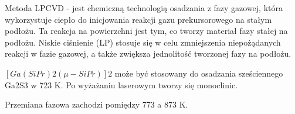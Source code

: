 Metoda LPCVD - jest chemiczną technologią osadzania z fazy gazowej, która wykorzystuje ciepło do inicjowania reakcji gazu prekursorowego na stałym podłożu. Ta reakcja na powierzchni jest tym, co tworzy materiał fazy stałej na podłożu. Niskie ciśnienie (LP) stosuje się w celu zmniejszenia niepożądanych reakcji w fazie gazowej, a także zwiększa jednolitość tworzonej fazy na podłożu.

$[Ga(SiPr)2(\mu-SiPr)]2$ może być stosowany do osadzania sześciennego Ga2S3 w 723 K. Po wyżażaniu laserowym tworzy się monoclinic.

Przemiana fazowa zachodzi pomiędzy 773 a 873 K. 

























 